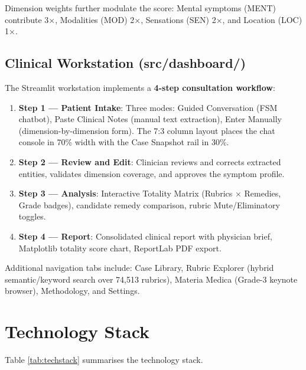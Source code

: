 Dimension weights further modulate the score: Mental symptoms (MENT) contribute 3×, Modalities (MOD) 2×, Sensations (SEN) 2×, and Location (LOC) 1×.

\subsection{Clinical Workstation (src/dashboard/)}

The Streamlit workstation implements a \textbf{4-step consultation workflow}:

\begin{enumerate}
  \item \textbf{Step 1 — Patient Intake}: Three modes: Guided Conversation (FSM chatbot), Paste Clinical Notes (manual text extraction), Enter Manually (dimension-by-dimension form). The 7:3 column layout places the chat console in 70\% width with the Case Snapshot rail in 30\%.
  \item \textbf{Step 2 — Review and Edit}: Clinician reviews and corrects extracted entities, validates dimension coverage, and approves the symptom profile.
  \item \textbf{Step 3 — Analysis}: Interactive Totality Matrix (Rubrics × Remedies, Grade badges), candidate remedy comparison, rubric Mute/Eliminatory toggles.
  \item \textbf{Step 4 — Report}: Consolidated clinical report with physician brief, Matplotlib totality score chart, ReportLab PDF export.
\end{enumerate}

Additional navigation tabs include: Case Library, Rubric Explorer (hybrid semantic/keyword search over 74,513 rubrics), Materia Medica (Grade-3 keynote browser), Methodology, and Settings.


\section{Technology Stack}

Table \ref{tab:techstack} summarises the technology stack.

